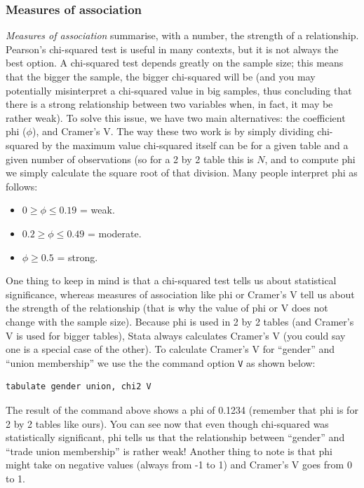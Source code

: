 \documentclass{article}
\begin{document}
\subsubsection*{Measures of association}

\textit{Measures of association} summarise, with a number, the strength of a relationship. Pearson’s chi-squared test is useful in many contexts, but it is not always the best option. A chi-squared test depends greatly on the sample size; this means that the bigger the sample, the bigger chi-squared will be (and you may potentially misinterpret a chi-squared value in big samples, thus concluding that there is a strong relationship between two variables when, in fact, it may be rather weak). To solve this issue, we have two main alternatives: the coefficient phi ($\phi$), and Cramer's V. The way these two work is by simply dividing chi-squared by the maximum value chi-squared itself can be for a given table and a given number of observations (so for a 2 by 2 table this is $N$, and to compute phi we simply calculate the square root of that division. Many people interpret phi as follows:

\begin{itemize}
	\item $0 \geq \phi \leq 0.19$ = weak.
	\item $0.2 \geq \phi \leq 0.49$ = moderate.
	\item $\phi \geq 0.5$ = strong.
\end{itemize}

One thing to keep in mind is that a chi-squared test tells us about statistical significance, whereas measures of association like phi or Cramer's V tell us about the strength of the relationship (that is why the value of phi or V does not change with the sample size). Because phi is used in 2 by 2 tables (and Cramer's V is used for bigger tables), Stata always calculates Cramer's V (you could say one is a special case of the other). To calculate Cramer's V for ``gender'' and ``union membership'' we use the the command option \texttt{V} as shown below:

\begin{lstlisting}
tabulate gender union, chi2 V
\end{lstlisting}

The result of the command above shows a phi of 0.1234 (remember that phi is for 2 by 2 tables like ours). You can see now that even though chi-squared was statistically significant, phi tells us that the relationship between ``gender'' and ``trade union membership'' is rather weak! Another thing to note is that phi might take on negative values (always from -1 to 1) and Cramer's V goes from 0 to 1.
\end{document}
